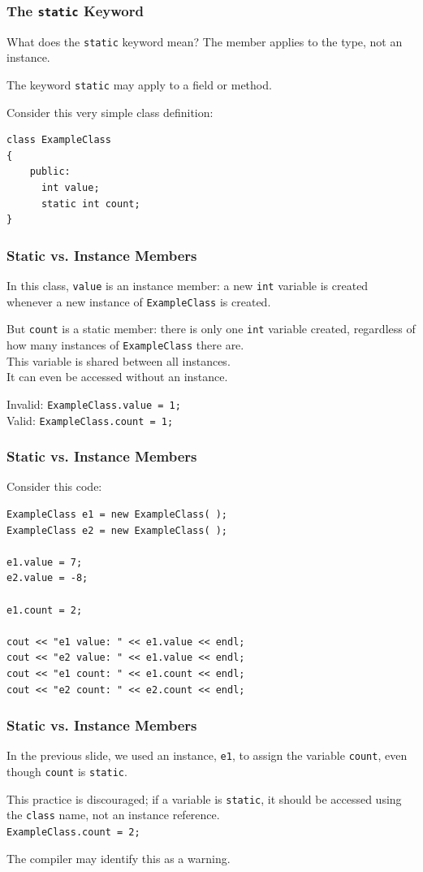 \begin{frame}[fragile]
\frametitle{The \texttt{static} Keyword}
What does the \texttt{static} keyword mean? The member applies to the type, not an instance.

The keyword \texttt{static} may apply to a field or method.

Consider this very simple class definition:
\begin{verbatim}
class ExampleClass
{
    public:
      int value;
      static int count;
}
\end{verbatim}

\end{frame}

\begin{frame}
\frametitle{Static vs. Instance Members}

In this class, \texttt{value} is an instance member: a new \texttt{int} variable is created whenever a new instance of \texttt{ExampleClass} is created.

But \texttt{count} is a static member: there is only one \texttt{int} variable created, regardless of how many instances of \texttt{ExampleClass} there are.\\
\quad This variable is shared between all instances.\\
\quad It can even be accessed without an instance.

Invalid: \texttt{ExampleClass.value = 1;}\\
Valid: \texttt{ExampleClass.count = 1;}

\end{frame}

\begin{frame}[fragile]
\frametitle{Static vs. Instance Members}
Consider this code:

\begin{verbatim}
ExampleClass e1 = new ExampleClass( );
ExampleClass e2 = new ExampleClass( );

e1.value = 7;
e2.value = -8;

e1.count = 2;

cout << "e1 value: " << e1.value << endl;
cout << "e2 value: " << e1.value << endl;
cout << "e1 count: " << e1.count << endl;
cout << "e2 count: " << e2.count << endl;
\end{verbatim}

\end{frame}

\begin{frame}
\frametitle{Static vs. Instance Members}
In the previous slide, we used an instance, \texttt{e1}, to assign the variable \texttt{count}, even though \texttt{count} is \texttt{static}.

This practice is discouraged; if a variable is \texttt{static}, it should be accessed using the \texttt{class} name, not an instance reference.\\
\quad \texttt{ExampleClass.count = 2;}

The compiler may identify this as a warning.

\end{frame}


